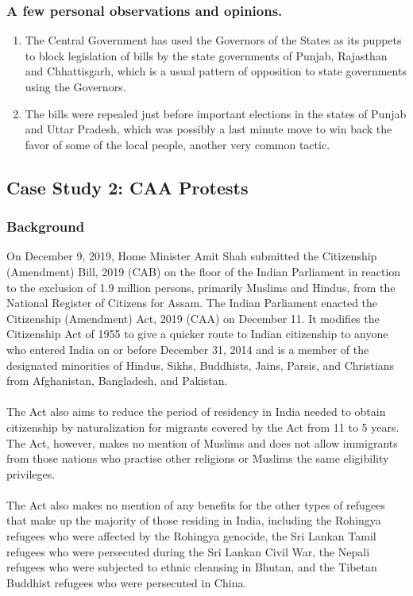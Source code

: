 \documentclass{article}
\begin{document}
\subsubsection{A few personal observations and opinions.}
\begin{enumerate}
    \item The Central Government has used the Governors of the States as its puppets to block legislation of bills by the state governments of Punjab, Rajasthan and Chhattisgarh, which is a usual pattern of opposition to state governments using the Governors.
    \item The bills were repealed just before important elections in the states of Punjab and Uttar Pradesh, which was possibly a last minute move to win back the favor of some of the local people, another very common tactic.

\end{enumerate}



\newpage
\subsection{Case Study 2: CAA Protests}
\subsubsection{Background}
    On December 9, 2019, Home Minister Amit Shah submitted the Citizenship (Amendment) Bill, 2019 (CAB) on the floor of the Indian Parliament in reaction to the exclusion of 1.9 million persons, primarily Muslims and Hindus, from the National Register of Citizens for Assam. The Indian Parliament enacted the Citizenship (Amendment) Act, 2019 (CAA) on December 11. It modifies the Citizenship Act of 1955 to give a quicker route to Indian citizenship to anyone who entered India on or before December 31, 2014 and is a member of the designated minorities of Hindus, Sikhs, Buddhists, Jains, Parsis, and Christians from Afghanistan, Bangladesh, and Pakistan.\\ \\
The Act also aims to reduce the period of residency in India needed to obtain citizenship by naturalization for migrants covered by the Act from 11 to 5 years. The Act, however, makes no mention of Muslims and does not allow immigrants from those nations who practise other religions or Muslims the same eligibility privileges.\\ \\
The Act also makes no mention of any benefits for the other types of refugees that make up the majority of those residing in India, including the Rohingya refugees who were affected by the Rohingya genocide, the Sri Lankan Tamil refugees who were persecuted during the Sri Lankan Civil War, the Nepali refugees who were subjected to ethnic cleansing in Bhutan, and the Tibetan Buddhist
refugees who were persecuted in China.
\end{document}
